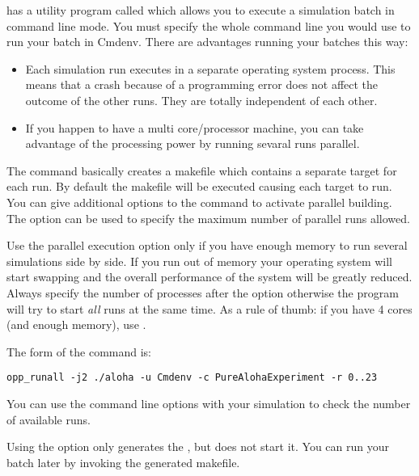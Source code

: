 {\opp} has a utility program called  which
allows you to execute a simulation batch in command line mode.
You must specify the whole command line you would use to run
your batch in Cmdenv. There are advantages running your batches
this way:
\begin{itemize}
  \item Each simulation run executes in a separate operating system process.
        This means that a crash because of a programming error does not affect
        the outcome of the other runs. They are totally independent of each other.
  \item If you happen to have a multi core/processor machine, you can take advantage
        of the processing power by running sevaral runs parallel.
\end{itemize}

The command basically creates a makefile which contains
a separate target for each run. By default the makefile will be executed causing each
target to run. You can give additional options to the  command to
activate parallel building. The  option can be used to specify the maximum number
of parallel runs allowed.

\begin{warning}
  Use the parallel execution option only if you have enough memory to run several simulations
  side by side. If you run out of memory your operating system will start swapping and the overall
  performance of the system will be greatly reduced. Always specify the number of processes
  after the  option otherwise the  program will try to start \textit{all}
  runs at the same time. As a rule of thumb: if you have 4 cores (and enough memory), use .
\end{warning}

The form of the command is:
\begin{verbatim}
opp_runall -j2 ./aloha -u Cmdenv -c PureAlohaExperiment -r 0..23
\end{verbatim}

You can use the  command line options with your simulation to
check the number of available runs.

Using the  option only generates the , but does not start it.
You can run your batch later by invoking the generated makefile.




